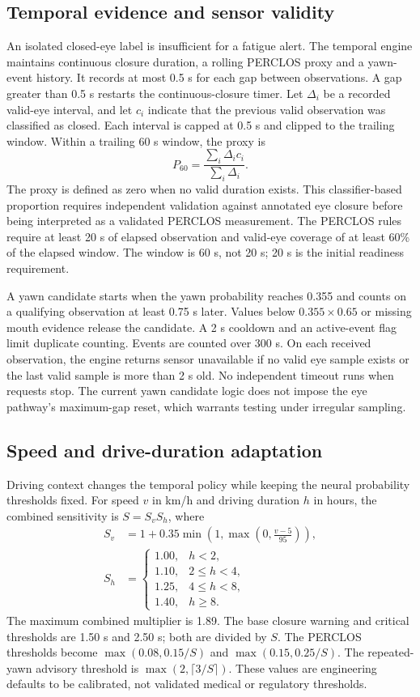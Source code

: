 \documentclass[pdflatex,sn-mathphys-num]{sn-jnl}
\begin{document}
\subsection{Temporal evidence and sensor validity}
An isolated closed-eye label is insufficient for a fatigue alert. The temporal engine maintains continuous closure duration, a rolling PERCLOS proxy and a yawn-event history. It records at most 0.5 s for each gap between observations. A gap greater than 0.5 s restarts the continuous-closure timer. Let $\Delta_i$ be a recorded valid-eye interval, and let $c_i$ indicate that the previous valid observation was classified as closed. Each interval is capped at 0.5 s and clipped to the trailing window. Within a trailing 60 s window, the proxy is
\begin{equation}
 P_{60}=\frac{\sum_i\Delta_i c_i}{\sum_i\Delta_i}.
\end{equation}
The proxy is defined as zero when no valid duration exists. This classifier-based proportion requires independent validation against annotated eye closure before being interpreted as a validated PERCLOS measurement. The PERCLOS rules require at least 20 s of elapsed observation and valid-eye coverage of at least 60\% of the elapsed window. The window is 60 s, not 20 s; 20 s is the initial readiness requirement.

A yawn candidate starts when the yawn probability reaches 0.355 and counts on a qualifying observation at least 0.75 s later. Values below $0.355\times0.65$ or missing mouth evidence release the candidate. A 2 s cooldown and an active-event flag limit duplicate counting. Events are counted over 300 s. On each received observation, the engine returns sensor unavailable if no valid eye sample exists or the last valid sample is more than 2 s old. No independent timeout runs when requests stop. The current yawn candidate logic does not impose the eye pathway's maximum-gap reset, which warrants testing under irregular sampling.

\subsection{Speed and drive-duration adaptation}
Driving context changes the temporal policy while keeping the neural probability thresholds fixed. For speed $v$ in km/h and driving duration $h$ in hours, the combined sensitivity is $S=S_vS_h$, where
\begin{align}
S_v&=1+0.35\min\!\left(1,\max\!\left(0,\frac{v-5}{95}\right)\right),\\
S_h&=\begin{cases}
1.00,&h<2,\\
1.10,&2\leq h<4,\\
1.25,&4\leq h<8,\\
1.40,&h\geq8.
\end{cases}
\end{align}
The maximum combined multiplier is 1.89. The base closure warning and critical thresholds are 1.50 s and 2.50 s; both are divided by $S$. The PERCLOS thresholds become $\max(0.08,0.15/S)$ and $\max(0.15,0.25/S)$. The repeated-yawn advisory threshold is $\max(2,\lceil3/S\rceil)$. These values are engineering defaults to be calibrated, not validated medical or regulatory thresholds.
\end{document}
